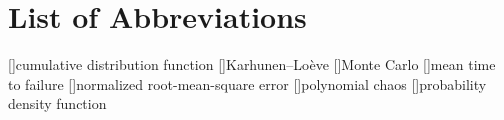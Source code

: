 \chapter*{List of Abbreviations}

\begin{acronym}[NRMSE]
[]{cumulative distribution function}
[]{Karhunen--Loève}
[]{Monte Carlo}
[]{mean time to failure}
[]{normalized root-mean-square error}
[]{polynomial chaos}
[]{probability density function}
\end{acronym}
